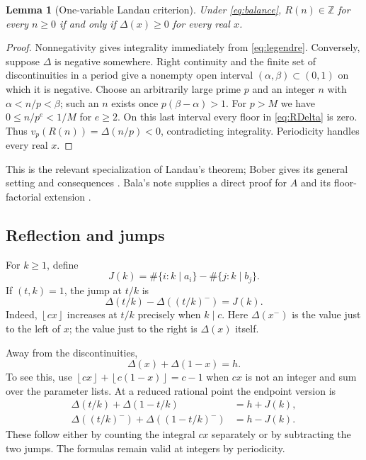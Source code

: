 \documentclass[11pt]{article}
\newtheorem{lemma}[theorem]{Lemma}
\theoremstyle{definition}
\theoremstyle{remark}
\newcommand{\Z}{\mathbb Z}
\newcommand{\vp}{v_p}
\newcommand{\floor}[1]{\left\lfloor #1\right\rfloor}
\begin{document}
\begin{lemma}[One-variable Landau criterion]\label{lem:landau}
Under \eqref{eq:balance}, $R(n)\in\Z$ for every $n\geq0$ if and only if
$\Delta(x)\geq0$ for every real $x$.
\end{lemma}
\begin{proof}
Nonnegativity gives integrality immediately from \eqref{eq:legendre}.
Conversely, suppose $\Delta$ is negative somewhere. Right continuity
and the finite set of discontinuities in a period give a nonempty open
interval $(\alpha,\beta)\subset(0,1)$ on which it is negative. Choose
an arbitrarily large prime $p$ and an integer $n$ with
$\alpha<n/p<\beta$; such an $n$ exists once $p(\beta-\alpha)>1$.
For $p>M$ we have $0\leq n/p^e<1/M$ for $e\geq2$. On this last
interval every floor in \eqref{eq:RDelta} is zero. Thus
$\vp(R(n))=\Delta(n/p)<0$, contradicting integrality. Periodicity
handles every real $x$.
\end{proof}
This is the relevant specialization of Landau's theorem; Bober gives
its general setting and consequences \cite[Section 3]{bober}. Bala's
note supplies a direct proof for $A$ and its floor-factorial extension
\cite{bala-note}.

\subsection{Reflection and jumps}
For $k\geq1$, define
\begin{equation}\label{eq:J}
 J(k)=\#\{i:k\mid a_i\}-\#\{j:k\mid b_j\}.
\end{equation}
If $(t,k)=1$, the jump at $t/k$ is
\begin{equation}\label{eq:jump}
 \Delta(t/k)-\Delta((t/k)^-)=J(k).
\end{equation}
Indeed, $\floor{c x}$ increases at $t/k$ precisely when $k\mid c$.
Here $\Delta(x^-)$ is the value just to the left of $x$; the value just
to the right is $\Delta(x)$ itself.

Away from the discontinuities,
\begin{equation}\label{eq:reflection}
 \Delta(x)+\Delta(1-x)=h.
\end{equation}
To see this, use $\floor{c x}+\floor{c(1-x)}=c-1$ when $cx$ is not
an integer and sum over the parameter lists. At a reduced rational
point the endpoint version is
\begin{align}
 \Delta(t/k)+\Delta(1-t/k)&=h+J(k),\label{eq:refRight}\\
 \Delta((t/k)^-)+\Delta((1-t/k)^-)&=h-J(k).\label{eq:refLeft}
\end{align}
These follow either by counting the integral $cx$ separately or by
subtracting the two jumps. The formulas remain valid at integers by
periodicity.
\end{document}

